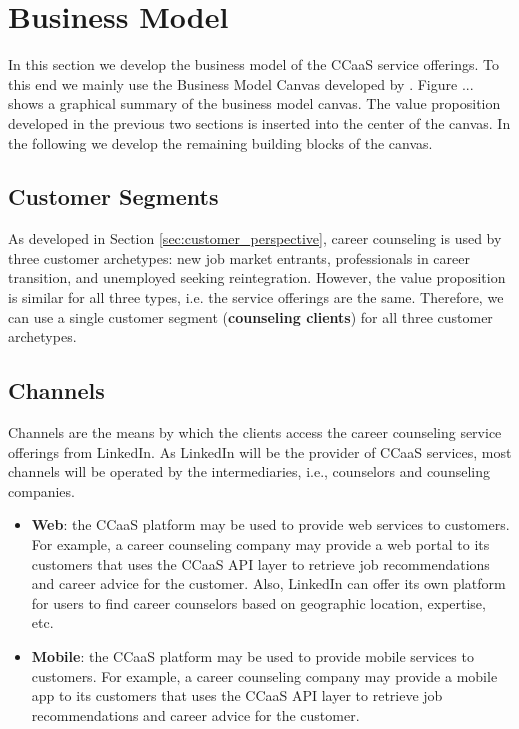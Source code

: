 \section{Business Model}
\label{sec:business_model}

In this section we develop the business model of the CCaaS service offerings. To this end we mainly
use the Business Model Canvas developed by \cite{osterwalderBusinessModelGeneration2010}. Figure ...
shows a graphical summary of the business model canvas. The value proposition developed in the previous
two sections is inserted into the center of the canvas. In the following we develop the remaining building
blocks of the canvas.

\subsection{Customer Segments}

As developed in Section \ref{sec:customer_perspective}, career counseling is used by three customer archetypes:
new job market entrants, professionals in career transition, and unemployed seeking reintegration. However, the
value proposition is similar for all three types, i.e. the service offerings are the same. Therefore, we can use
a single customer segment (\textbf{counseling clients}) for all three customer archetypes.


\subsection{Channels}

Channels are the means by which the clients access the career counseling service offerings from LinkedIn.
As LinkedIn will be the provider of CCaaS services, most channels will be operated by the intermediaries,
i.e., counselors and counseling companies.

\begin{itemize}
    \item \textbf{Web}: the CCaaS platform may be used to provide web services to customers.
            For example, a career counseling company may provide a web portal to its customers
            that uses the CCaaS API layer to retrieve job recommendations and career advice for
            the customer. Also, LinkedIn can offer its own platform for users to find career
            counselors based on geographic location, expertise, etc.
    \item \textbf{Mobile}: the CCaaS platform may be used to provide mobile services to customers.
            For example, a career counseling company may provide a mobile app to its customers
            that uses the CCaaS API layer to retrieve job recommendations and career advice for
            the customer.
\end{itemize}

